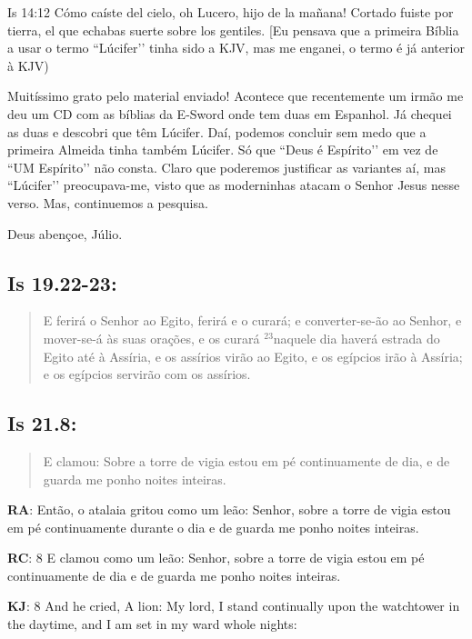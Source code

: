 Is 14:12 Cómo caíste del cielo, oh Lucero, hijo de la mañana! Cortado
fuiste por tierra, el que echabas suerte sobre los gentiles. [Eu
pensava que a primeira Bíblia a usar o termo ``Lúcifer’’ tinha sido a
KJV, mas me enganei, o termo é já anterior à KJV)

Muitíssimo grato pelo material enviado! Acontece que recentemente um
irmão me deu um CD com as bíblias da E-Sword onde tem duas em
Espanhol. Já chequei as duas e descobri que têm Lúcifer. Daí, podemos
concluir sem medo que a primeira Almeida tinha também Lúcifer. Só que
``Deus é Espírito’’ em vez de ``UM Espírito’’ não consta. Claro que
poderemos justificar as variantes aí, mas ``Lúcifer’’ preocupava-me,
visto que as moderninhas atacam o Senhor Jesus nesse verso. Mas,
continuemos a pesquisa.

Deus abençoe,
Júlio.

\subsection*{Is 19.22-23:} 
 \begin{quote}
  \small
 E ferirá o Senhor ao Egito, ferirá e o curará; e converter-se-ão ao Senhor, e mover-se-á às suas orações, e os curará\uwave{;} $^{\mathrm{23}}$naquele dia haverá estrada do Egito até à Assíria, e os assírios virão ao Egito, e os egípcios irão à Assíria; e os egípcios servirão com os assírios.
 \end{quote}

\subsection*{Is 21.8:} 
 \begin{quote}
  \small
 E clamou:  Sobre a torre de vigia estou em pé continuamente de dia, e de guarda me ponho noites inteiras.
\end{quote}

\textbf{RA}: Então, o atalaia gritou como um leão: Senhor, sobre a torre de vigia estou em pé continuamente durante o dia e de guarda me ponho noites inteiras.

\textbf{RC}: 8 E clamou como um leão: Senhor, sobre a torre de vigia estou em pé continuamente de dia e de guarda me ponho noites inteiras.

\textbf{KJ}: 8 And he cried, A lion: My lord, I stand continually upon the watchtower in the daytime, and I am set in my ward whole nights:

